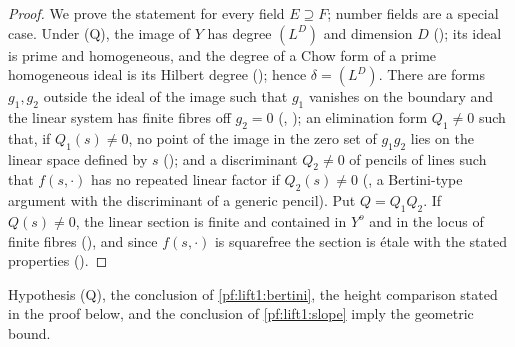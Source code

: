 \begin{proof}
We prove the statement for every field $E\supseteq F$; number fields are a special case. Under (Q), the image of $Y$ has degree $(L^D)$ and dimension $D$
(); its ideal is prime and homogeneous, and the
degree of a Chow form of a prime homogeneous ideal is its Hilbert degree
(); hence $\delta=(L^D)$. There
are forms $g_1,g_2$ outside the ideal of the image such that $g_1$ vanishes on the boundary and the
linear system has finite fibres off $g_2=0$
(,
); an elimination form
$Q_1\ne0$ such that, if $Q_1(s)\ne0$, no point of the image in the zero set of $g_1g_2$ lies on the linear
space defined by $s$ (); and a
discriminant $Q_2\ne0$ of pencils of lines such that $f(s,\cdot)$ has no repeated linear factor if
$Q_2(s)\ne0$ (, a Bertini-type argument with the
discriminant of a generic pencil). Put $Q=Q_1Q_2$. If $Q(s)\ne0$, the linear section is finite and
contained in $Y^o$ and in the locus of finite fibres
(), and since $f(s,\cdot)$ is
squarefree the section is \'etale with the stated properties
().
\end{proof}

\begin{theorem}\label{pf:lift1:geobound}
Hypothesis (Q), the conclusion of \cref{pf:lift1:bertini}, the height comparison stated in the proof
below, and the conclusion of \cref{pf:lift1:slope} imply the geometric bound.
\end{theorem}

